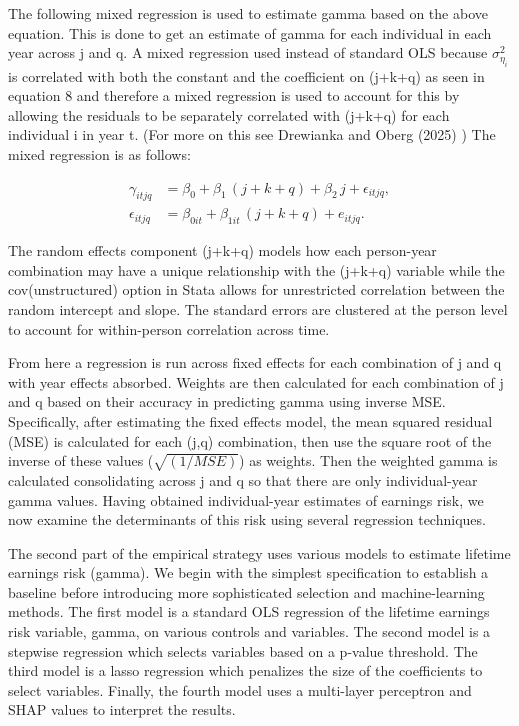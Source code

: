 \documentclass[12pt]{article}
\begin{document}
\begin{onehalfspace}
The following mixed regression is used to estimate gamma based on the above equation. This is done to get an estimate of gamma for each individual in each year across j and q. A mixed regression used instead of standard OLS because $\sigma^2_{\eta_i}$ is correlated with both the constant and the coefficient on (j+k+q) as seen in equation 8 and therefore a mixed regression is used to account for this by allowing the residuals to be separately correlated with (j+k+q) for each individual i in year t. (For more on this see Drewianka and Oberg (2025) \cite{drewianka2025}) The mixed regression is as follows:

\begin{align}
\gamma_{itjq}
&= \beta_{0}
  + \beta_{1}\,(j + k + q)
  + \beta_{2}\,j
  + \epsilon_{itjq}, \\[1ex]
\epsilon_{itjq}
&= \beta_{0it}
  + \beta_{1it}\,(j + k + q)
  + e_{itjq}.
\end{align}

The random effects component (j+k+q) models how each person-year combination may have a unique relationship with the (j+k+q) variable while the cov(unstructured) option in Stata allows for unrestricted correlation between the random intercept and slope. The standard errors are clustered at the person level to account for within-person correlation across time.

From here a regression is run across fixed effects for each combination of j and q with year effects absorbed. Weights are then calculated for each combination of j and q based on their accuracy in predicting gamma using inverse MSE. Specifically, after estimating the fixed effects model, the mean squared residual (MSE) is calculated for each (j,q) combination, then use the square root of the inverse of these values ($\sqrt{(1/MSE)}$) as weights. Then the weighted gamma is calculated consolidating across j and q so that there are only individual-year gamma values. Having obtained individual-year estimates of earnings risk, we now examine the determinants of this risk using several regression techniques.

The second part of the empirical strategy uses various models to estimate lifetime earnings risk (gamma). We begin with the simplest specification to establish a baseline before introducing more sophisticated selection and machine-learning methods. The first model is a standard OLS regression of the lifetime earnings risk variable, gamma, on various controls and variables. The second model is a stepwise regression which selects variables based on a p-value threshold. The third model is a lasso regression which penalizes the size of the coefficients to select variables. Finally, the fourth model uses a multi-layer perceptron and SHAP values to interpret the results.


\end{onehalfspace}
\end{document}
